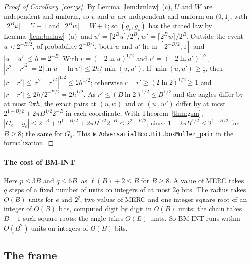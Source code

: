 \documentclass[11pt]{amsart}
\theoremstyle{definition}
\numberwithin{equation}{section}
\begin{document}
\begin{proof}[Proof of Corollary~\ref{cor:gs}]
By Lemma~\ref{lem:bmlaw}~(c), $U$ and $W$ are independent and uniform, so $u$ and $w$ are independent and uniform on $(0,1]$, with $\lceil2^Bu\rceil=U+1$ and $\lceil2^Bw\rceil=W+1$; so $(g_c,g_s)$ has the stated law by Lemma~\ref{lem:bmlaw}~(a), and $u'=\lceil2^Bu\rceil/2^B$, $w'=\lceil2^Bw\rceil/2^B$. Outside the event $u<2^{-B/2}$, of probability $2^{-B/2}$, both $u$ and $u'$ lie in $[2^{-B/2},1]$ and $|u-u'|\le h=2^{-B}$. With $r=(-2\ln u)^{1/2}$ and $r'=(-2\ln u')^{1/2}$, $|r^2-r'^2|=2|\ln u-\ln u'|\le2h/\min(u,u')$. If $\min(u,u')\ge\frac12$, then $|r-r'|\le|r^2-r'^2|^{1/2}\le2h^{1/2}$; otherwise $r+r'\ge(2\ln2)^{1/2}\ge1$ and $|r-r'|\le2h/2^{-B/2}=2h^{1/2}$. As $r'\le(B\ln2)^{1/2}\le B^{1/2}$ and the angles differ by at most $2\pi h$, the exact pairs at $(u,w)$ and at $(u',w')$ differ by at most $2^{1-B/2}+2\pi B^{1/2}2^{-B}$ in each coordinate.
 With Theorem~\ref{thm:gsm}, $|G_c-g_c|\le2^{-B}+2^{1-B/2}+2\pi B^{1/2}2^{-B}\le2^{2-B/2}$, since $1+2\pi B^{1/2}\le2^{1+B/2}$ for $B\ge8$; the same for $G_s$.
This is \texttt{AdversarialBco.Bit.boxMuller\_pair} in the formalization.
\end{proof}

\paragraph{The cost of BM-INT} Here $p\le3B$ and $q\le6B$, as $\ell(B)+2\le B$ for $B\ge8$. A value of MERC takes $q$ steps of a fixed number of units on integers of at most $2q$ bits. The radius takes $O(B)$ units for $e$ and $2^q$, two values of MERC and one integer square root of an integer of $O(B)$ bits, computed digit by digit in $O(B)$ units; the chain takes $B-1$ such square roots; the angle takes $O(B)$ units. So BM-INT runs within $O(B^2)$ units on integers of $O(B)$ bits.

\subsection{The frame}
\end{document}
